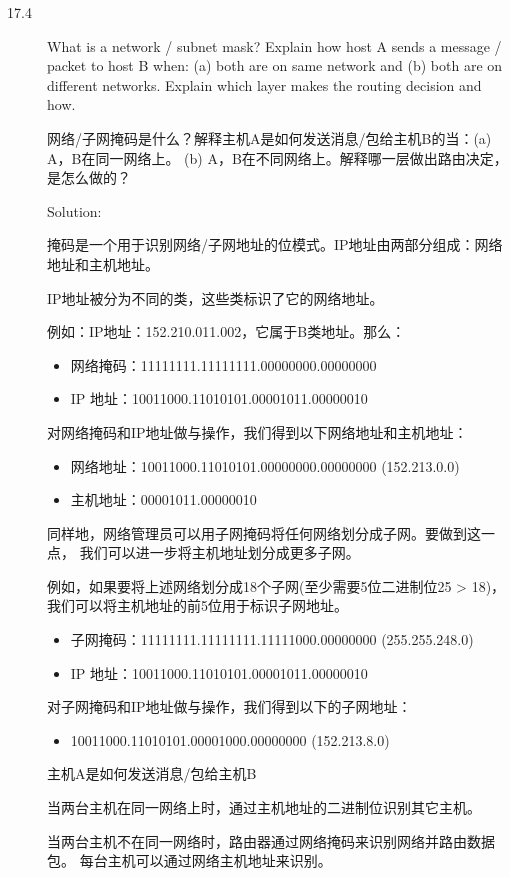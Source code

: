 \begin{description}
\item[17.4] What is a network / subnet mask? Explain how host A sends a message / packet to host B when: (a) both are on same network and (b) both are on different networks. Explain which layer makes the routing decision and how.

  网络/子网掩码是什么？解释主机A是如何发送消息/包给主机B的当：(a) A，B在同一网络上。 (b) A，B在不同网络上。解释哪一层做出路由决定，是怎么做的？

  Solution:

  掩码是一个用于识别网络/子网地址的位模式。IP地址由两部分组成：网络地址和主机地址。

  IP地址被分为不同的类，这些类标识了它的网络地址。

  例如：IP地址：152.210.011.002，它属于B类地址。那么：
\begin{itemize}
\item 网络掩码：11111111.11111111.00000000.00000000
\item IP 地址：10011000.11010101.00001011.00000010
\end{itemize}
  对网络掩码和IP地址做与操作，我们得到以下网络地址和主机地址：
  \begin{itemize}
\item     网络地址：10011000.11010101.00000000.00000000 (152.213.0.0)
\item     主机地址：00001011.00000010
  \end{itemize}
  同样地，网络管理员可以用子网掩码将任何网络划分成子网。要做到这一点， 我们可以进一步将主机地址划分成更多子网。

  例如，如果要将上述网络划分成18个子网(至少需要5位二进制位25 > 18)， 我们可以将主机地址的前5位用于标识子网地址。
  \begin{itemize}
\item     子网掩码：11111111.11111111.11111000.00000000 (255.255.248.0)
\item     IP 地址：10011000.11010101.00001011.00000010
  \end{itemize}
  对子网掩码和IP地址做与操作，我们得到以下的子网地址：
  \begin{itemize}
\item     10011000.11010101.00001000.00000000 (152.213.8.0)
  \end{itemize}
  主机A是如何发送消息/包给主机B

  当两台主机在同一网络上时，通过主机地址的二进制位识别其它主机。

  当两台主机不在同一网络时，路由器通过网络掩码来识别网络并路由数据包。 每台主机可以通过网络主机地址来识别。


\end{description}
